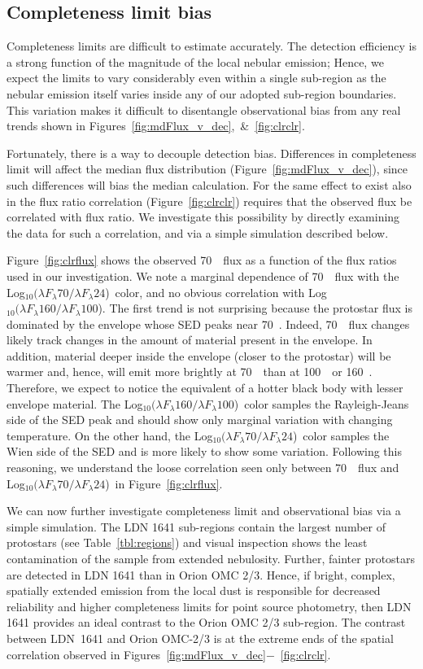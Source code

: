\documentclass[manuscript]{aastex61}
\newcommand{\clra}{Log$_{10}(\lambda F_\lambda70/\lambda F_\lambda24$)}
\newcommand{\clrb}{Log$_{10}(\lambda F_\lambda160/\lambda F_\lambda100$)}
\begin{document}
\subsection{Completeness limit bias}
\label{sec:compbias}
\par
Completeness limits are difficult to estimate accurately.  The detection efficiency is a strong function of the magnitude of the local nebular emission;  Hence, we expect the limits to vary considerably even within a single sub-region as the nebular emission itself varies inside any of our adopted sub-region boundaries.  This variation makes it difficult to disentangle observational bias from any real trends shown in Figures~\ref{fig:mdFlux_v_dec},~\&~\ref{fig:clrclr}.
\par
Fortunately, there is a way to decouple detection bias.   Differences in completeness limit will affect the median flux distribution (Figure~\ref{fig:mdFlux_v_dec}), since such differences will bias the median calculation.  For the same effect to exist also in the flux ratio correlation (Figure~\ref{fig:clrclr}) requires that the observed flux be correlated with flux ratio.  We investigate this possibility by directly examining  the data for such a correlation, and via a simple simulation described below.
\par
Figure~\ref{fig:clrflux} shows the observed 70~\micron\ flux as a function of the flux ratios used in our investigation.  We note a marginal dependence of 70~\micron\ flux with the \clra\ color, and no obvious correlation with \clrb.  The first trend is not surprising because the protostar flux is dominated by the envelope whose SED peaks near 70~\micron.  Indeed, 70~\micron\ flux changes likely track changes in the amount of material present in the envelope.  In addition, material deeper inside the envelope (closer to the protostar) will be warmer and, hence, will emit more brightly at 70~\micron\ than at 100~\micron\ or 160~\micron.  Therefore, we expect to notice the equivalent of a hotter black body with lesser envelope material.  The \clrb\ color samples the Rayleigh-Jeans side of the SED peak and should show only marginal variation with changing temperature.  On the other hand, the \clra\ color samples the Wien side of the SED and is more likely to show some variation.  Following this reasoning, we understand the loose correlation seen only  between 70~\micron\ flux and \clra\ in Figure~\ref{fig:clrflux}.
\par
We can now further investigate completeness limit and observational bias via a simple simulation.  The LDN 1641 sub-regions contain the largest number of protostars (see Table~\ref{tbl:regions}) and visual inspection shows the least contamination of the sample from extended nebulosity. Further, fainter protostars are detected in LDN 1641 than in Orion OMC 2/3. Hence, if bright, complex, spatially extended emission from the local dust is responsible for decreased reliability and higher completeness limits for point source photometry, then LDN 1641 provides an ideal contrast to the Orion OMC 2/3 sub-region. The contrast between LDN~1641 and Orion OMC-2/3 is at the extreme ends of the spatial correlation observed in Figures~\ref{fig:mdFlux_v_dec}$-$~\ref{fig:clrclr}.
\end{document}
